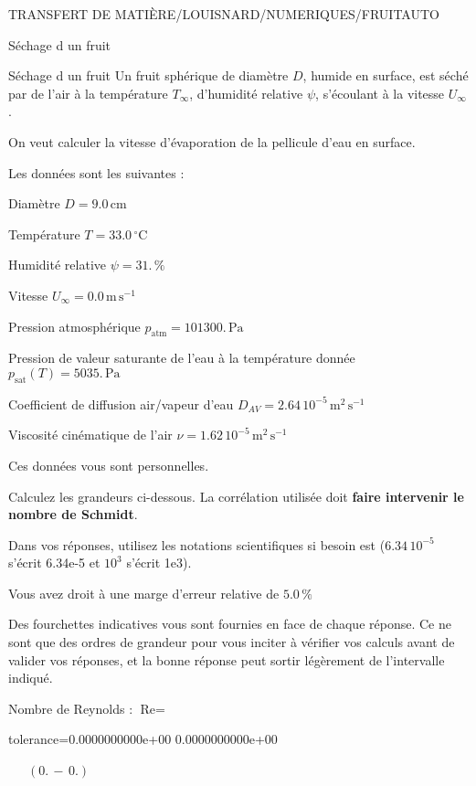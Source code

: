 \documentclass[12pt]{article}
\begin{document}
\begin{quiz}{TRANSFERT DE MATIÈRE/LOUISNARD/NUMERIQUES/FRUITAUTO}
\begin{cloze}{Séchage d un fruit}
\end{cloze} 


 \begin{cloze}{Séchage d un fruit} 
Un fruit sphérique de diamètre $D$, humide en surface, est séché par de l'air à la température $T_\infty$, d'humidité relative $\psi$, s'écoulant à la vitesse $U_\infty$.

On veut calculer la vitesse d'évaporation de la pellicule d'eau en surface.

 

Les données sont les suivantes :

 

Diamètre $D = 9.0\,  \mathrm{cm} $

Température $T = 33.0\,  \mathrm{^\circ\mathrm{C}} $

Humidité relative $\psi = 31.\, \% $

Vitesse $U_\infty = 0.0\,  \mathrm{m}\,  \mathrm{s}^{-1} $

Pression atmosphérique $p_{\text{atm}} = 101300.\,  \mathrm{Pa} $

Pression de valeur saturante de l’eau à la température donnée $p_{\text{sat}}(T) = 5035.\,  \mathrm{Pa} $

Coefficient de diffusion air/vapeur d’eau $D_{AV} =  2.64 \, 10^{-5} \,  \mathrm{m}^{2}\,  \mathrm{s}^{-1} $

Viscosité cinématique de l’air $\nu =  1.62 \, 10^{-5} \,  \mathrm{m}^{2}\,  \mathrm{s}^{-1} $

Ces données vous sont personnelles.

 

Calculez les grandeurs ci-dessous. La corrélation utilisée doit \textbf{faire intervenir le nombre de Schmidt}.

Dans vos réponses, utilisez les notations scientifiques si besoin est ($6.34\, 10^{-5}$ s'écrit 6.34e-5 et $10^{3}$ s'écrit 1e3).

Vous avez droit à une marge d'erreur relative de $5.0\, \% $

Des fourchettes indicatives vous sont fournies en face de chaque réponse. Ce ne sont que des ordres de grandeur pour vous inciter à vérifier vos calculs avant de valider vos réponses, et la bonne réponse peut sortir légèrement de l'intervalle indiqué.

 

Nombre de Reynolds : $\text{Re} =  $
\begin{numerical}[points=1] 
\item[tolerance={0.0000000000e+00}] 0.0000000000e+00 
\end{numerical} 
 $\,$ 
 $ \quad (0. \, - \, 0.) $ 


\end{cloze}
\end{quiz}
\end{document}
